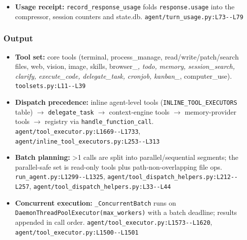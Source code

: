 \begin{itemize}
\item \textbf{Usage receipt:} \texttt{record\_\allowbreak{}response\_\allowbreak{}usage} folds \texttt{response.\allowbreak{}usage} into the compressor, session counters and state.db. \texttt{agent/\allowbreak{}turn\_\allowbreak{}usage.\allowbreak{}py:\allowbreak{}L73-\allowbreak{}-\allowbreak{}L79}
\end{itemize}

\subsubsection*{Output}
\begin{itemize}
\item \textbf{Tool set:} core tools (terminal, process\_manage, read/write/patch/search files, web, vision, image, skills, browser\_\emph{, todo, memory, session\_search, clarify, execute\_code, delegate\_task, cronjob, kanban\_}, computer\_use). \texttt{toolsets.\allowbreak{}py:\allowbreak{}L11-\allowbreak{}-\allowbreak{}L39}
\item \textbf{Dispatch precedence:} inline agent-level tools (\texttt{INLINE\_\allowbreak{}TOOL\_\allowbreak{}EXECUTORS} table) $\rightarrow$ \texttt{delegate\_\allowbreak{}task} $\rightarrow$ context-engine tools $\rightarrow$ memory-provider tools $\rightarrow$ registry via \texttt{handle\_\allowbreak{}function\_\allowbreak{}call}. \texttt{agent/\allowbreak{}tool\_\allowbreak{}executor.\allowbreak{}py:\allowbreak{}L1669-\allowbreak{}-\allowbreak{}L1733}, \texttt{agent/\allowbreak{}inline\_\allowbreak{}tool\_\allowbreak{}executors.\allowbreak{}py:\allowbreak{}L253-\allowbreak{}-\allowbreak{}L313}
\item \textbf{Batch planning:} >1 calls are split into parallel/sequential segments; the parallel-safe set is read-only tools plus path-non-overlapping file ops. \texttt{run\_\allowbreak{}agent.\allowbreak{}py:\allowbreak{}L1299-\allowbreak{}-\allowbreak{}L1325}, \texttt{agent/\allowbreak{}tool\_\allowbreak{}dispatch\_\allowbreak{}helpers.\allowbreak{}py:\allowbreak{}L212-\allowbreak{}-\allowbreak{}L257}, \texttt{agent/\allowbreak{}tool\_\allowbreak{}dispatch\_\allowbreak{}helpers.\allowbreak{}py:\allowbreak{}L33-\allowbreak{}-\allowbreak{}L44}
\item \textbf{Concurrent execution:} \texttt{\_\allowbreak{}ConcurrentBatch} runs on \texttt{DaemonThreadPoolExecutor(\allowbreak{}max\_\allowbreak{}workers)} with a batch deadline; results appended in call order. \texttt{agent/\allowbreak{}tool\_\allowbreak{}executor.\allowbreak{}py:\allowbreak{}L1573-\allowbreak{}-\allowbreak{}L1620}, \texttt{agent/\allowbreak{}tool\_\allowbreak{}executor.\allowbreak{}py:\allowbreak{}L1500-\allowbreak{}-\allowbreak{}L1501}

\end{itemize}

